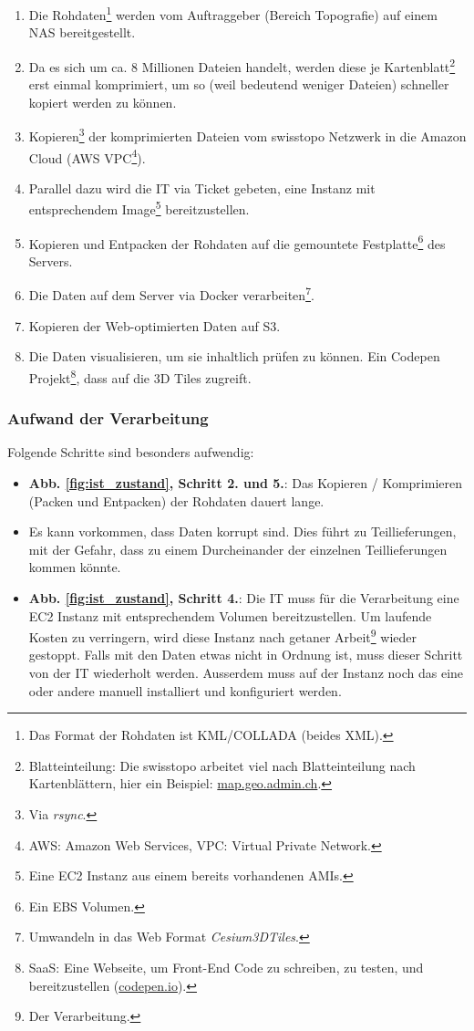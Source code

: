 \begin{enumerate}
\item Die Rohdaten\footnote{Das Format der Rohdaten ist KML/COLLADA (beides XML).} werden vom Auftraggeber (Bereich Topografie) auf einem NAS bereitgestellt.
\item Da es sich um ca. 8 Millionen Dateien handelt, werden diese je Kartenblatt\footnote{Blatteinteilung: Die swisstopo arbeitet viel nach Blatteinteilung nach Kartenblättern, hier ein Beispiel: \href{https://s.geo.admin.ch/8b5f3f6721}{map.geo.admin.ch}.} erst einmal komprimiert, um so (weil bedeutend weniger Dateien) schneller kopiert werden zu können.
\item Kopieren\footnote{Via \emph{rsync}.} der komprimierten Dateien vom swisstopo Netzwerk in die Amazon Cloud (AWS VPC\footnote{AWS: Amazon Web Services, VPC: Virtual Private Network.}).
\item Parallel dazu wird die IT via Ticket gebeten, eine Instanz mit entsprechendem Image\footnote{Eine EC2 Instanz aus einem bereits vorhandenen AMIs.} bereitzustellen.
\item Kopieren und Entpacken der Rohdaten auf die gemountete Festplatte\footnote{Ein EBS Volumen.} des Servers.
\item Die Daten auf dem Server via Docker verarbeiten\footnote{Umwandeln in das Web Format \emph{Cesium3DTiles}.}.
\item Kopieren der Web-optimierten Daten auf S3.
\item Die Daten visualisieren, um sie inhaltlich prüfen zu können. Ein Codepen Projekt\footnote{SaaS: Eine Webseite, um Front-End Code zu schreiben, zu testen, und bereitzustellen (\href{https://codepen.io}{codepen.io}).}, dass auf die 3D Tiles zugreift.
\end{enumerate}

\subsubsection{Aufwand der Verarbeitung}
\label{aufwand_prozessierung}
Folgende Schritte sind besonders aufwendig:
\begin{itemize}
\item \textbf{Abb. \ref{fig:ist_zustand}, Schritt 2. und 5.}: Das Kopieren / Komprimieren (Packen und Entpacken) der Rohdaten dauert lange.
\item Es kann vorkommen, dass Daten korrupt sind. Dies führt zu Teillieferungen, mit der Gefahr, dass zu einem Durcheinander der einzelnen Teillieferungen kommen könnte.
\item \textbf{Abb. \ref{fig:ist_zustand}, Schritt 4.}: Die IT muss für die Verarbeitung eine EC2 Instanz mit entsprechendem Volumen bereitzustellen. Um laufende Kosten zu verringern, wird diese Instanz nach getaner Arbeit\footnote{Der Verarbeitung.} wieder gestoppt. Falls mit den Daten etwas nicht in Ordnung ist, muss dieser Schritt von der IT wiederholt werden. Ausserdem muss auf der Instanz noch das eine oder andere manuell installiert und konfiguriert werden.
\end{itemize}

